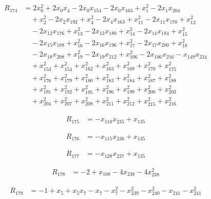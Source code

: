 \documentclass[11pt,letterpaper]{article}
\theoremstyle{definition}
\theoremstyle{remark}
\begin{document}
\begin{align*}
R_{174} &= 2 x_{0}^{2} +2 x_{0} x_{4} -2 x_{0} x_{154} -2 x_{0} x_{163} +x_{1}^{2} -2 x_{1} x_{204} \\
&\quad +x_{2}^{2} -2 x_{2} x_{192} +x_{4}^{2} -2 x_{4} x_{163} +x_{11}^{2} -2 x_{11} x_{170} +x_{12}^{2} \\
&\quad -2 x_{12} x_{176} +x_{13}^{2} -2 x_{13} x_{180} +x_{14}^{2} -2 x_{14} x_{184} +x_{15}^{2} \\
&\quad -2 x_{15} x_{188} +x_{16}^{2} -2 x_{16} x_{196} +x_{17}^{2} -2 x_{17} x_{200} +x_{18}^{2} \\
&\quad -2 x_{18} x_{208} +x_{19}^{2} -2 x_{19} x_{212} +x_{106}^{2} -2 x_{106} x_{216} -x_{149} x_{234} \\
&\quad +x_{153}^{2} +x_{154}^{2} +x_{162}^{2} +x_{163}^{2} +x_{169}^{2} +x_{170}^{2} +x_{175}^{2} \\
&\quad +x_{176}^{2} +x_{179}^{2} +x_{180}^{2} +x_{183}^{2} +x_{184}^{2} +x_{187}^{2} +x_{188}^{2} \\
&\quad +x_{191}^{2} +x_{192}^{2} +x_{195}^{2} +x_{196}^{2} +x_{199}^{2} +x_{200}^{2} +x_{203}^{2} \\
&\quad +x_{204}^{2} +x_{207}^{2} +x_{208}^{2} +x_{211}^{2} +x_{212}^{2} +x_{215}^{2} +x_{216}^{2}
\end{align*}

\begin{align*}
R_{175} &= -x_{110} x_{235} +x_{135}
\end{align*}

\begin{align*}
R_{176} &= -x_{115} x_{236} +x_{135}
\end{align*}

\begin{align*}
R_{177} &= -x_{128} x_{237} +x_{135}
\end{align*}

\begin{align*}
R_{178} &= -2 +x_{108} -4 x_{238} -4 x_{238}^{2}
\end{align*}

\begin{align*}
R_{179} &= -1 +x_{5} +x_{5} x_{7} -x_{7} -x_{7}^{2} -x_{239}^{2} -x_{240}^{2} -x_{241} -x_{241}^{2}
\end{align*}
\end{document}
